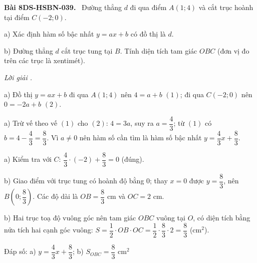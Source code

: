 \documentclass[12pt,a4paper]{article}
\newenvironment{problem}[1][]{\par\medskip\noindent\textbf{Bài #1.}\ }{\par}
\newenvironment{solution}[1][]{\par\noindent\textit{Lời giải #1.}\par}{\par}
\begin{document}
\begin{problem}[8DS-HSBN-039]
Đường thẳng $d$ đi qua điểm $A(1; 4)$ và cắt trục hoành tại điểm $C(-2; 0)$.

a) Xác định hàm số bậc nhất $y = ax + b$ có đồ thị là $d$.

b) Đường thẳng $d$ cắt trục tung tại $B$. Tính diện tích tam giác $OBC$ (đơn vị đo trên các trục là xentimét).

\begin{solution}
a) Đồ thị $y = ax + b$ đi qua $A(1; 4)$ nên $4 = a + b$ $(1)$; đi qua $C(-2; 0)$ nên $0 = -2a + b$ $(2)$.

a) Trừ vế theo vế $(1)$ cho $(2)$: $4 = 3a$, suy ra $a = \dfrac{4}{3}$; từ $(1)$ có $b = 4 - \dfrac{4}{3} = \dfrac{8}{3}$. Vì $a \neq 0$ nên hàm số cần tìm là hàm số bậc nhất $y = \dfrac{4}{3}x + \dfrac{8}{3}$.

a) Kiểm tra với $C$: $\dfrac{4}{3} \cdot (-2) + \dfrac{8}{3} = 0$ (đúng).

b) Giao điểm với trục tung có hoành độ bằng $0$; thay $x = 0$ được $y = \dfrac{8}{3}$, nên $B\left(0; \dfrac{8}{3}\right)$. Các độ dài là $OB = \dfrac{8}{3}$ cm và $OC = 2$ cm.

b) Hai trục toạ độ vuông góc nên tam giác $OBC$ vuông tại $O$, có diện tích bằng nửa tích hai cạnh góc vuông: $S = \dfrac{1}{2} \cdot OB \cdot OC = \dfrac{1}{2} \cdot \dfrac{8}{3} \cdot 2 = \dfrac{8}{3}$ (cm$^2$).

Đáp số: a) $\boxed{y = \dfrac{4}{3}x + \dfrac{8}{3}}$; b) $\boxed{S_{OBC} = \dfrac{8}{3} \text{ cm}^2}$
\end{solution}
\end{problem}
\end{document}
